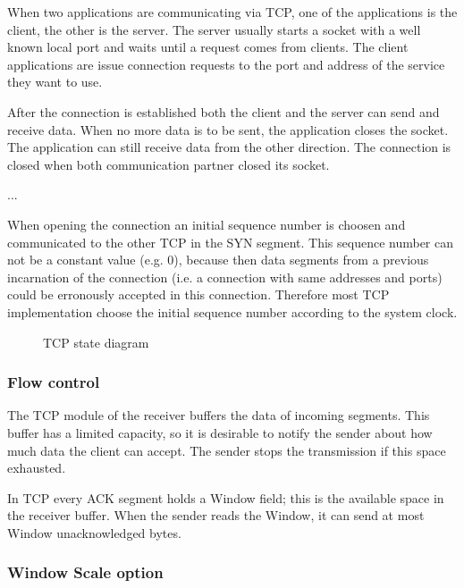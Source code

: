 When two applications are communicating via TCP, one of the applications is the client,
the other is the server. The server usually starts a socket with a well known local port
and waits until a request comes from clients. The client applications are issue connection
requests to the port and address of the service they want to use.

After the connection is established both the client and the server can send and receive data.
When no more data is to be sent, the application closes the socket. The application can still
receive data from the other direction. The connection is closed when both communication partner
closed its socket.

...

When opening the connection an initial sequence number is choosen and communicated to the
other TCP in the SYN segment. This sequence number can not be a constant value (e.g. 0),
because then data segments from a previous incarnation of the connection (i.e. a connection
with same addresses and ports) could be erronously accepted in this connection. Therefore
most TCP implementation choose the initial sequence number according to the system clock.

\begin{figure}[htbp]
  \begin{center}
    
    \caption{TCP state diagram}
    \label{fig:tcp_states}
  \end{center}
\end{figure}

\subsubsection{Flow control}
\label{subsec:flow_control}

The TCP module of the receiver buffers the data of incoming segments.
This buffer has a limited capacity, so it is desirable to notify the sender
about how much data the client can accept. The sender stops the transmission
if this space exhausted.

In TCP every ACK segment holds a Window field; this is the available space
in the receiver buffer. When the sender reads the Window, it can send at most
Window unacknowledged bytes.

\subsubsection*{Window Scale option}

